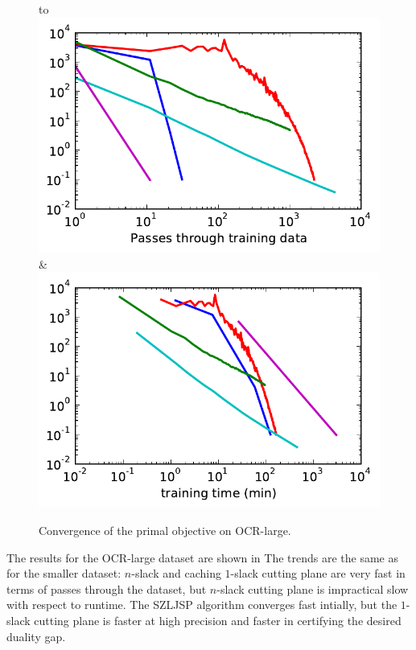 \begin{figure}
    \begin{tabu} to 
    \\[-3mm]
    \includegraphics[width=\linewidth]{evaluation/images/letters_big_log}&%
    \includegraphics[width=\linewidth]{evaluation/images/letters_big_log_time}
    \end{tabu}
\caption{%
   Convergence of the primal objective on OCR-large. 
}
\end{figure}

The results for the OCR-large dataset are shown in 
The trends are the same as for the smaller dataset: $n$-slack and caching $1$-slack cutting plane are very fast
in terms of passes through the dataset, but $n$-slack cutting plane is impractical slow
with respect to runtime. The SZLJSP algorithm converges fast intially, but the $1$-slack cutting plane
is faster at high precision and faster in certifying the desired duality gap.

